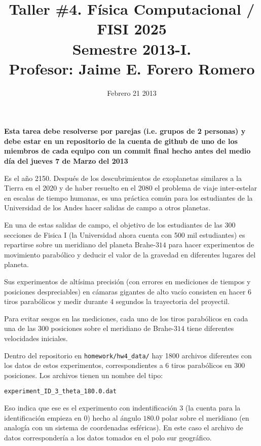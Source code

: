\documentclass{article}
\title{Taller \#4. F\'isica Computacional / FISI 2025 \\Semestre
  2013-I. \\ Profesor: Jaime E. Forero Romero}
\date{Febrero 21 2013}
\begin{document}
\maketitle

{\bf Esta tarea debe resolverse por parejas (i.e. grupos de 2
  personas) y debe estar en un repositorio de la cuenta de github de
  uno de los miembros de cada equipo con un commit final hecho antes del
  medio d\'ia del jueves 7 de Marzo del 2013}  

Es el a\~no 2150. Despu\'es de los descubrimientos de exoplanetas
similares a la Tierra en el 2020 y de haber resuelto en el 2080 el
problema de viaje inter-estelar en escalas de tiempo humanas, es una
pr\'actica com\'un para los estudiantes de la Universidad de los Andes
hacer salidas de campo a otros planetas.
 
En una de estas salidas de campo, el objetivo de los estudiantes de
las 300 secciones de Fisica I (la Universidad ahora cuenta con 500 mil
estudiantes) es repartirse sobre un meridiano del planeta Brahe-$314$
para hacer experimentos de movimiento parab\'olico y deducir el valor
de la gravedad en diferentes lugares del planeta.

Sus experimentos de alt\'isima precisi\'on (con errores en mediciones
de tiempos y posiciones despreciables) en c\'amaras gigantes de alto
vac\'io consisten en hacer 6 tiros parab\'olicos y medir durante 4
segundos la trayectoria del proyectil. 

Para evitar sesgos en las mediciones, cada uno de los tiros
parab\'olicos en cada una de las 300 posiciones sobre el meridiano de
Brahe-$314$ tiene diferentes velocidades iniciales. 

Dentro del repositorio en \verb"homework/hw4_data/" hay 1800
archivos diferentes con los datos de estos experimentos,
correspondientes a 6 tiros parab\'olicos en 300 posiciones. Los
archivos tienen un nombre del tipo:
\begin{center}
\verb"experiment_ID_3_theta_180.0.dat"\\
\end{center}

Eso indica que ese es el experimento con indentificaci\'on 3 (la
cuenta para la identificaci\'on empieza en 0) hecho al \'angulo
$180.0$ polar sobre el meridiano (en analog\'ia con un sistema de
coordenadas esf\'ericas). En este caso el archivo de datos
corresponder\'ia a los datos tomados en el polo sur geogr\'afico. 
\end{document}
